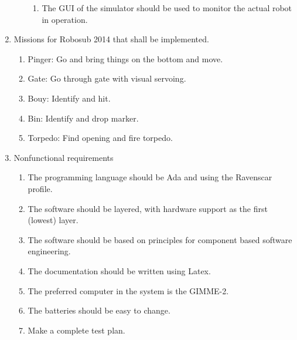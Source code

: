 \begin{enumerate}
\begin{enumerate}
\begin{enumerate}
\item The GUI of the simulator should be used to monitor the actual robot in operation.
\end{enumerate}
\end{enumerate}
\item Missions for Robosub 2014 that shall be implemented.
\begin{enumerate}
\item Pinger: Go and bring things on the bottom and move.
\item Gate: Go through gate with visual servoing. 
\item Bouy: Identify and hit. 
\item Bin: Identify and drop marker.
\item Torpedo: Find opening and fire torpedo.
\end{enumerate}
\item Nonfunctional requirements
\begin{enumerate}
\item The programming language should be Ada and using the Ravenscar profile.
\item The software should be layered, with hardware support as the first (lowest) layer. 
\item The software should be based on principles for component based software engineering. 
\item The documentation should be written using Latex.
\item The preferred computer in the system is the GIMME-2.
\item The batteries should be easy to change.
\item Make a complete test plan.
\end{enumerate}
\end{enumerate}

